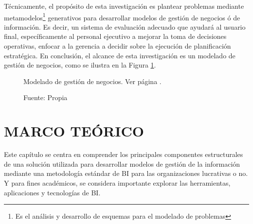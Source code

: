 \documentclass[12pt,jou]{apa7}
\begin{document}
Técnicamente, el propósito de esta investigación es plantear problemas mediante metamodelos\footnote{Es el análisis y desarrollo de esquemas para el modelado de problemas} generativos para desarrollar modelos de gestión de negocios ó de información. Es decir, un sistema de evaluación adecuado que ayudará al usuario final, específicamente al personal ejecutivo a mejorar la toma de decisiones operativas, enfocar a la gerencia a decidir sobre la ejecución de planificación estratégica. En conclusión, el alcance de esta investigación es un modelado de gestión de negocios, como se ilustra en la Figura \ref{fig:modeloGestionN}.

\begin{figure}[h]  
\caption{Modelado de gestión de negocios. Ver página \pageref{fig02}.}  
\label{fig:modeloGestionN}
\centering
{}
\caption*{ Fuente: Propia} 	
\end{figure}


\section{MARCO TEÓRICO} 

Este capítulo se centra en comprender los principales componentes estructurales de una solución utilizada para desarrollar modelos de gestión de la información mediante una metodología estándar de BI para las organizaciones lucrativas o no. Y para fines académicos, se considera importante explorar las herramientas, aplicaciones y tecnologías de BI.
\end{document}
